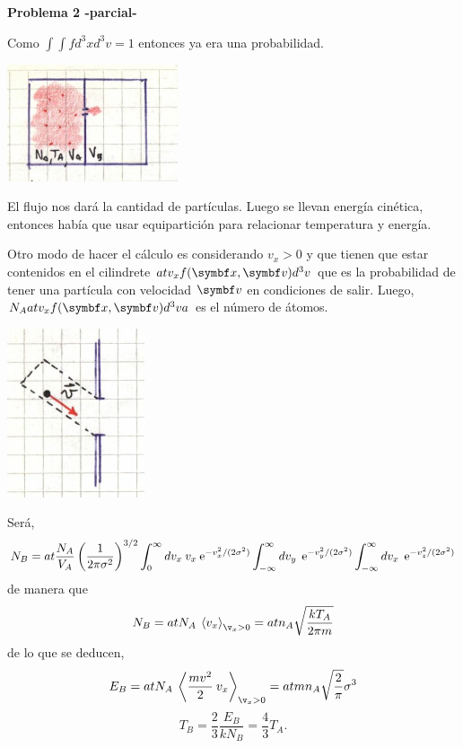 \documentclass[10pt,oneside]{CBFT_book}
\begin{document}
\begin{ejemplo}{\bf Problema 2 -parcial-}

Como $ \int \int f d^3x d^3v = 1 $ entonces ya era una probabilidad.


\includegraphics[scale=0.5]{images/1606329542.jpg}

El flujo nos dará la cantidad de partículas. Luego se llevan energía cinética, entonces había que usar
equipartición para relacionar temperatura y energía.

Otro modo de hacer el cálculo es considerando $ v_x > 0 $ y que tienen que estar contenidos en el
cilindrete $ a t v_x f(\vbx,\vbv) d^3v $ que es la probabilidad de tener una partícula con velocidad
$\vbv$ en condiciones de salir. Luego, $ N_A a t v_x f(\vbx,\vbv) d^3v a$ es el número de átomos.

\includegraphics[scale=0.5]{images/1606329545.jpg}

Será,
\[
	N_B =  a t \frac{ N_A }{ V_A } \left( \frac{ 1 }{ 2\pi\sigma^2 } \right)^{3/2} 
	\int_0^\infty dv_x \: v_x \:\mathrm{e}^{- v_x^2 / ( 2 \sigma^2 ) }
	\int_{-\infty}^\infty dv_y \: \:\mathrm{e}^{- v_y^2 / ( 2 \sigma^2 ) }
	\int_{-\infty}^\infty dv_x \: \:\mathrm{e}^{- v_z^2 / ( 2 \sigma^2 ) }
\]
de manera que
\[
	N_B = a t N_A \vm{ v_x }_{\v_x>0} = a t n_A \sqrt{ \frac{ k T_A }{ 2 \pi m } }
\]
de lo que se deducen,
\[
	E_B =  a t N_A \vm{ \frac{m v^2}{2} \: v_x }_{\v_x>0} =
	a t m n_A \sqrt{ \frac{2}{\pi} } \sigma^3
\]
\[
	T_B  = \frac{2}{3} \frac{ E_B }{ k N_B } = \frac{ 4 }{ 3 } T_A.
\] 
 
\end{ejemplo}



\end{document}
